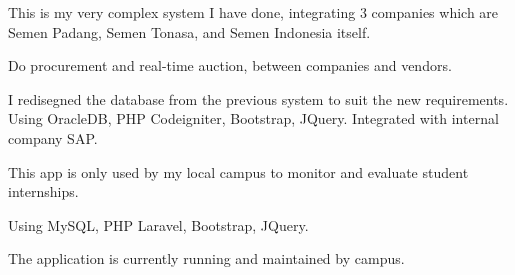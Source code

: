 \documentclass[letterpaper]{deedy-resume} %
\begin{document}
\begin{minipage}[t]{0.66\textwidth}
\begin{tightitemize}
\item This is my very complex system I have done, integrating 3 companies which are Semen Padang, Semen Tonasa, and Semen Indonesia itself.
\item Do procurement and real-time auction, between companies and vendors.
\item I redisegned the database from the previous system to suit the new requirements. Using OracleDB, PHP Codeigniter, Bootstrap, JQuery. Integrated with internal company SAP.
\end{tightitemize}
\sectionspace



\begin{tightitemize}
\item This app is only used by my local campus to monitor and evaluate student internships.
\item Using MySQL, PHP Laravel, Bootstrap, JQuery.
\item The application is currently running and maintained by campus.
\end{tightitemize}
\sectionspace


\end{minipage}
\end{document}
